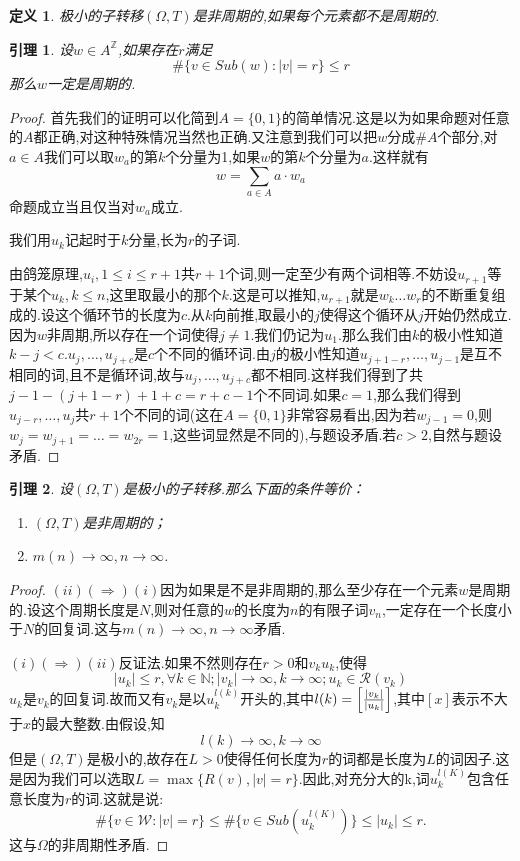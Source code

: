 \documentclass[a4paper,11pt,oneside]{book}
\newtheorem{lemma}{\textbf{\hspace{0.7cm}引理}}[section]
\newtheorem{definition}{\textbf{\hspace{0.7cm}定义}}[section]
\begin{document}
\begin{definition}
极小的子转移$(\Omega,T)$是非周期的,如果每个元素都不是周期的.
\end{definition}
\begin{lemma}
设$w\in A^{\mathbb{Z}}$,如果存在$r$满足
$$\#\{v\in Sub(w):|v|=r\}\leq r$$
那么$w$一定是周期的.
\end{lemma}
\begin{proof}
首先我们的证明可以化简到$A=\{0,1\}$的简单情况.这是以为如果命题对任意的$A$都正确,对这种特殊情况当然也正确.又注意到我们可以把$w$分成$\#A$个部分,对$a\in A$我们可以取$w_a$的第$k$个分量为1,如果$w$的第$k$个分量为$a$.这样就有
$$w=\sum_{a\in A} a\cdot w_a$$
命题成立当且仅当对$w_a$成立.


我们用$u_k$记起时于$k$分量,长为$r$的子词.

由鸽笼原理,$u_{i},1\leq i\leq r+1$共$r+1$个词,则一定至少有两个词相等.不妨设$u_{r+1}$等于某个$u_k,k\leq n$,这里取最小的那个$k$.这是可以推知,$u_{r+1}$就是$w_k\ldots w_r$的不断重复组成的.设这个循环节的长度为$c$.从$k$向前推,取最小的$j$使得这个循环从$j$开始仍然成立.因为$w$非周期,所以存在一个词使得$j\ne 1$.我们仍记为$u_1$.那么我们由$k$的极小性知道$k-j< c$.$u_j,\ldots ,u_{j+c}$是$c$个不同的循环词.由$j$的极小性知道$u_{j+1-r},\ldots ,u_{j-1}$是互不相同的词,且不是循环词,故与$u_j,\ldots ,u_{j+c}$都不相同.这样我们得到了共$j-1-(j+1-r)+1+c=r+c-1$个不同词.如果$c=1$,那么我们得到$u_{j-r},\ldots,u_j$共$r+1$个不同的词(这在$A=\{0,1\}$非常容易看出,因为若$w_{j-1}=0$,则$w_j=w_{j+1}=\ldots=w_{2r}=1$,这些词显然是不同的),与题设矛盾.若$c>2$,自然与题设矛盾.
\end{proof}
\begin{lemma}
\label{l:1}
设$(\Omega,T)$是极小的子转移.那么下面的条件等价：
\begin{enumerate}
\item $(\Omega,T)$是非周期的；
\item $m(n)\rightarrow \infty,n\rightarrow \infty$.
\end{enumerate}
\end{lemma}

\begin{proof}
$(ii)(\Rightarrow)(i)$因为如果是不是非周期的,那么至少存在一个元素$w$是周期的.设这个周期长度是$N$,则对任意的$w$的长度为$n$的有限子词$v_n$,一定存在一个长度小于$N$的回复词.这与$m(n)\rightarrow \infty,n\rightarrow \infty$矛盾.

$(i)(\Rightarrow)(ii)$反证法.如果不然则存在$r>0$和${v_k}{u_k}$,使得
$$|u_k|\leq r,\forall k\in\mathbb{N};|v_k|\rightarrow \infty ,k\rightarrow \infty;u_k\in\mathcal{R}(v_k)$$
$u_k$是$v_k$的回复词.故而又有$v_k$是以$u_k^{l(k)}$开头的,其中$l(k)=\left[{|v_k|\over |u_k|}\right]$,其中$[x]$表示不大于$x$的最大整数.由假设,知
\begin{equation*}
l(k)\rightarrow \infty,k\rightarrow \infty
\end{equation*}
但是$(\Omega,T)$是极小的,故存在$L>0$使得任何长度为$r$的词都是长度为$L$的词因子.这是因为我们可以选取$L=\max\{R(v),|v|=r\}$.因此,对充分大的k,词$u_k^{l(K)}$包含任意长度为$r$的词.这就是说:
$$\#\{v\in\mathcal{W}:|v|=r\}\leq\#\{v\in Sub(u_k^{l(K)})\}\leq |u_k|\leq r.$$
这与$\Omega$的非周期性矛盾.

\end{proof}
\end{document}
